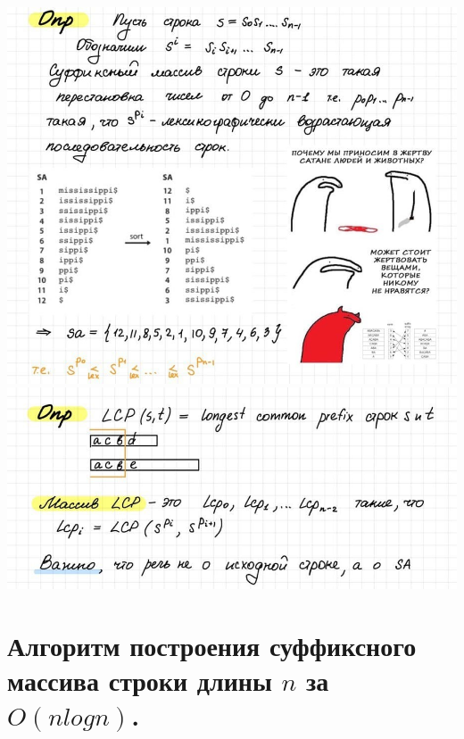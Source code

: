 \includegraphics[width=1\linewidth]{images/SA1.jpg}
\newline \includegraphics[width=1\linewidth]{images/SA2.jpg}
\newpage

\section{Алгоритм построения суффиксного массива строки длины $n$ за $O(n log n)$.}

